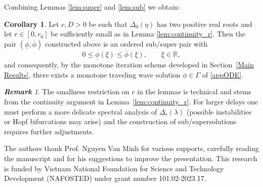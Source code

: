 \documentclass[12pt,letterpaper]{amsart}
\theoremstyle{definition}
\newtheorem{corollary}[theorem]{Corollary}
\theoremstyle{remark}
\newtheorem{remark}[theorem]{{\bf Remark}}
\numberwithin{equation}{section}
\begin{document}
 Combining Lemmas \ref{lem:super} and \ref{lem:sub} we obtain:
 
 \begin{corollary}\label{cor:app_exist}
 	Let $c,D>0$ be such that $\Delta_0(\eta)$ has two positive real roots and let $r\in[0,r_0]$ be sufficiently small as in Lemma \textnormal{\ref{lem:continuity_r}}. Then the pair $(\underline\phi,\overline\phi)$ constructed above is an ordered sub/super pair with
 	\[
 	0\le \underline\phi(\xi)\le \overline\phi(\xi),\qquad \xi\in\mathbb R,
 	\]
 	and consequently, by the monotone iteration scheme developed in Section~\ref{Main Results}, there exists a monotone traveling wave solution $\phi\in\Gamma$ of \eqref{appODE}.
 \end{corollary}
 
 \begin{remark}
 	The smallness restriction on $r$ in the lemmas is technical and stems from the continuity argument in Lemma~\ref{lem:continuity_r}. For larger delays one must perform a more delicate spectral analysis of $\Delta_r(\lambda)$ (possible instabilities or Hopf bifurcations may arise) and the construction of sub/supersolutions requires further adjustments.
 \end{remark}


\vskip 0.5cm








The authors thank Prof. Nguyen Van Minh for various supports, carefully reading the manuscript and for his suggestions to improve the presentation. %
This research is funded by Vietnam National Foundation for Science
and Technology Development (NAFOSTED) under grant number 101.02-2023.17.
 
 
\end{document}
